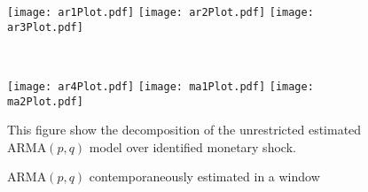 \documentclass[12pt]{article}
\begin{document}
\begin{figure}[!htbp]\centering
    \begin{minipage}{\textwidth}
    \caption{ARMA$(p,q)$ contemporaneously estimated in a window }
    \vspace{2ex}
    \begin{minipage}{\textwidth}
    \texttt{[image: ar1Plot.pdf]}  \texttt{[image: ar2Plot.pdf]} \texttt{[image: ar3Plot.pdf]}
\end{minipage}
    \\
    \begin{minipage}{\textwidth}
    \texttt{[image: ar4Plot.pdf]}
    \texttt{[image: ma1Plot.pdf]}
    \texttt{[image: ma2Plot.pdf]}
\end{minipage}
\begin{flushleft}\scriptsize
    This figure show the decomposition of the unrestricted estimated ARMA$(p,q)$ model over \citet{BRW2021} identified monetary shock. 
\end{flushleft}
    \end{minipage}
\end{figure}
\end{document}
